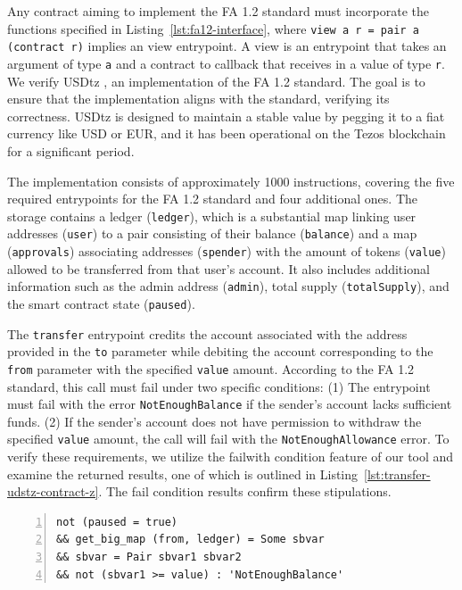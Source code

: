 \documentclass[runningheads]{llncs}
\begin{document}
Any contract aiming to implement the FA 1.2 standard must incorporate the functions specified in Listing~\ref{lst:fa12-interface}, where
\lstinline/view a r = pair a (contract r)/ implies an view entrypoint.
A view is an entrypoint that takes an argument of type \lstinline/a/ and a contract to callback that receives in a value of type \lstinline/r/. 
We verify USDtz \cite{usdtzimplemetation,tzstatsusdtz}, an implementation of the FA 1.2 standard. The goal is to ensure that the implementation aligns with the standard, verifying its correctness. USDtz is designed to maintain a stable value by pegging it to a fiat currency like USD or EUR, and it has been operational on the Tezos blockchain for a significant period.

The implementation consists of approximately 1000 instructions, covering the five required entrypoints for the FA 1.2 standard and four additional ones. The storage contains a ledger (\lstinline/ledger/), which is a substantial map linking user addresses (\lstinline/user/) to a pair consisting of their balance (\lstinline/balance/) and a map (\lstinline/approvals/) associating addresses (\lstinline/spender/) with the amount of tokens (\lstinline/value/) allowed to be transferred from that user's account. It also includes additional information such as the admin address (\lstinline/admin/), total supply (\lstinline/totalSupply/), and the smart contract state (\lstinline/paused/).

The \lstinline/transfer/ entrypoint credits the account associated with the address provided in the \lstinline/to/ parameter while debiting the account corresponding to the \lstinline/from/ parameter with the specified \lstinline/value/ amount. According to the FA 1.2 standard, this call must fail under two specific conditions: (1) The entrypoint must fail with the error \lstinline/NotEnoughBalance/ if the sender's account lacks sufficient funds. (2) If the sender's account does not have permission to withdraw the specified \lstinline/value/ amount, the call will fail with the \lstinline/NotEnoughAllowance/ error. To verify these requirements, we utilize the failwith condition feature of our tool and examine the returned results, one of which is outlined in Listing~\ref{lst:transfer-udstz-contract-z}. The fail condition results confirm these stipulations.
\begin{lstlisting}[float,captionpos=b,caption={The \lstinline/NotEnoughBalance/ fail condition for the \lstinline/transfer/ entrypoint},label={lst:transfer-udstz-contract-z},numbers=left]
not (paused = true) 
&& get_big_map (from, ledger) = Some sbvar 
&& sbvar = Pair sbvar1 sbvar2 
&& not (sbvar1 >= value) : 'NotEnoughBalance'
\end{lstlisting}
\end{document}
